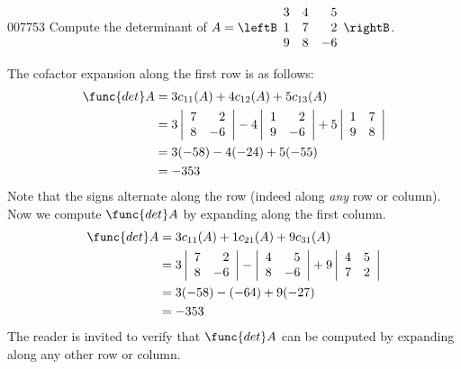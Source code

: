 \begin{example}{}{007753}
Compute the determinant of
$
A = \leftB \begin{array}{rrr}
3 & 4 & 5 \\
1 & 7 & 2 \\
9 & 8 & -6
\end{array}
\rightB$.

\begin{solution}
The cofactor expansion along the first row is as follows:
\begin{align*}
\func{det } A &= 3c_{11}(A) + 4c_{12}(A) + 5c_{13}(A) \\
&= 3 \left| \begin{array}{rr}
7 & 2 \\
8 & -6 
\end{array} \right| - 4 \left| \begin{array}{rr}
1 & 2 \\
9 & -6 
\end{array} \right| + 5 
\left| \begin{array}{rr}
1 & 7 \\
9 & 8 
\end{array} \right| \\ 
&= 3 (-58) - 4(-24) + 5(-55) \\
&= -353
\end{align*}
Note that the signs alternate along the row (indeed along \textit{any} row or column). Now we compute $\func{det } A$ by expanding along the first column.
\begin{align*}
\func{det } A &= 3c_{11}(A) + 1c_{21}(A) + 9c_{31}(A) \\
&= 3 \left| \begin{array}{rr}
7 & 2 \\
8 & -6 
\end{array} \right| - \left| \begin{array}{rr}
4 & 5 \\
8 & -6 
\end{array} \right| + 9 
\left| \begin{array}{rr}
4 & 5 \\
7 & 2 
\end{array} \right| \\ 
&= 3 (-58) - (-64) + 9(-27) \\
&= -353
\end{align*}
The reader is invited to verify that $\func{det } A$ can be computed by expanding along any other row or column.
\end{solution}
\end{example}

